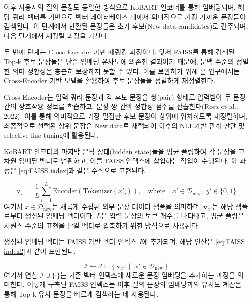 \documentclass[a4paper,fleqn]{cas-sc}
\begin{document}
이후 사용자의 질의 문장도 동일한 방식으로 KoBART 인코더를 통해 임베딩되며, 해당 쿼리 벡터를 기반으로 벡터 데이터베이스 내에서 의미적으로 가장 가까운 문장들이 검색된다. 이 단계에서 반환된 문장들은 초기 후보(New data candidates)로 간주되며, 다음 단계에서 재정렬 과정을 거친다.

두 번째 단계는 Cross-Encoder 기반 재랭킹 과정이다. 앞서 FAISS를 통해 검색된 Top-k 후보 문장들은 단순 임베딩 유사도에 의존한 결과이기 때문에, 문맥 수준의 정밀한 의미 정합성을 충분히 보장하지 못할 수 있다. 이를 보완하기 위해 본 연구에서는 Cross-Encoder 기반 모델을 활용하여 후보 문장들을 정밀하게 재정렬한다.

Cross-Encoder는 입력 쿼리 문장과 각 후보 문장을 쌍(pair) 형태로 입력받아 두 문장 간의 상호작용 정보를 학습하고, 문장 쌍 간의 정합성 점수를 산출한다(Rosa et al., 2022). 이를 통해 의미적으로 가장 밀접한 후보 문장이 상위에 위치하도록 재정렬하며, 최종적으로 선택된 상위 문장은 New data로 채택되어 이후의 NLI 기반 관계 판단 및 selective fine-tuning에 활용된다. 

KoBART 인코더의 마지막 은닉 상태(hidden state)들을 평균 풀링하여 각 문장을 고차원 임베딩 벡터로 변환하고, 이를 FAISS 인덱스에 삽입하는 작업이 수행된다. 이 과정은 \cref{eq:FAISS index}과 같은 수식으로 표현된다.

\begin{equation}
    \mathbf{v}_{x'} = \frac{1}{L} \sum_{i=1}^{L} \mathrm{Encoder}(\mathrm{Tokenizer}(x'_i)), \quad \text{where} \quad x' \in \mathcal{D}_{\text{new}}, \; y' \in \{0, 1\}
    \label{eq:FAISS index}
\end{equation}
여기서  \( x \in \mathcal{D}_{\text{new}} \)는 새롭게 수집된 외부 문장 데이터 샘플을 의미하며, \( \mathbf{v}_{x'} \)는 해당 샘플로부터 생성된 임베딩 벡터이다. 
\( L \)은 입력 문장의 토큰 개수를 나타내고, 평균 풀링은 시퀀스 수준의 표현을 단일 벡터로 압축하기 위한 방식으로 사용된다.

생성된 임베딩 벡터는 FAISS 기반 벡터 인덱스 \( I\)에 추가되며, 해당 연산은 \cref{eq:FAISS index2}과 같이 표현된다. 

\begin{equation}
    \mathcal{I} \leftarrow \mathcal{I} \cup \left\{ \mathbf{v}_{x'} \;\middle|\; x' \in \mathcal{D}_{\text{new}} \right\}
    \label{eq:FAISS index2}
\end{equation}
\noindent
여기서 연산 \( \mathcal{I} \cup \{ \cdot \} \)는 기존 벡터 인덱스에 새로운 문장 임베딩을 추가하는 과정을 의미한다. 이렇게 구축된 FAISS 인덱스는 이후 질의 문장의 임베딩과의 유사도 계산을 통해 Top-k 유사 문장을 빠르게 검색하는 데 사용된다. 
\end{document}
